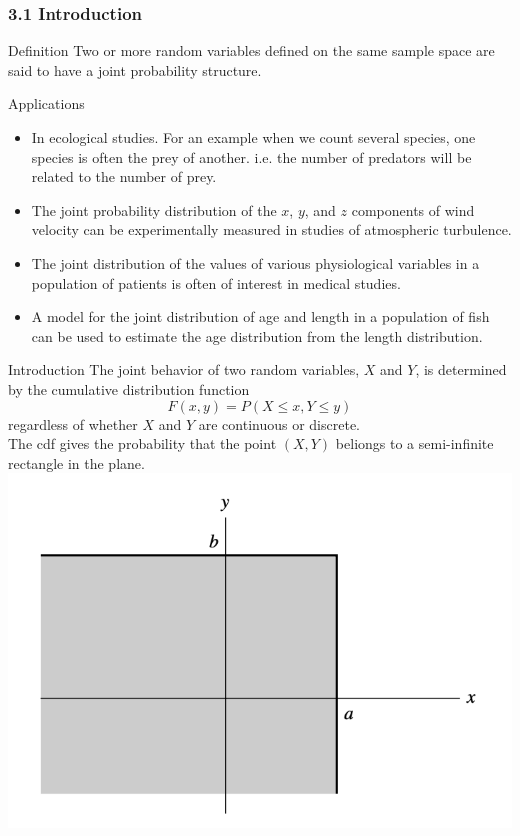 \documentclass{beamer}
\begin{document}
\begin{frame}
    \frametitle{3.1 Introduction}

    \begin{block}{Definition}
        Two or more random variables defined on the same sample space are said to have a joint probability structure.
    \end{block}\pause

    \begin{block}{Applications}
        \begin{itemize}
            \item In ecological studies. For an example when we count several species, one species is often the prey of another. i.e. the number of predators will be related to the number of prey.  \pause 
            \item The joint probability distribution of the \(x\), \(y\), and \(z\) components of wind velocity can be experimentally measured in studies of atmospheric turbulence. \pause 
            \item The joint distribution of the values of various physiological variables in a population of patients is often of interest in medical studies. \pause
            \item A model for the joint distribution of age and length in a population of fish can be used to estimate the age distribution from the length distribution.
        \end{itemize}
    \end{block}

\end{frame}


\begin{frame}{Introduction}
    The joint behavior of two random variables, \(X\) and \(Y\), is determined by the cumulative distribution function \[F(x,y)= P(X \leq x, Y \leq y)\] regardless of whether \(X\) and \(Y\) are continuous or discrete. \\ \pause 
    \vspace{0.1in}
    The cdf gives the probability that the point \((X,Y)\) beliongs to a semi-infinite rectangle in the plane. 
    \includegraphics[scale=0.5]{Figures/Figure_5.png}
\end{frame}
\end{document}
